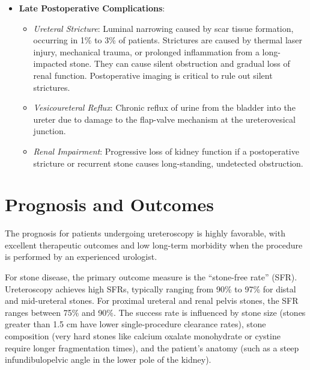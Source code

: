 \begin{itemize}
\begin{itemize}
  \item \textit{Urinary Retention}: Inability to void post-operatively due to bladder spasms, urethral irritation, or blood clots.
  \item \textit{Steinstrasse}: A column of small stone fragments that blocks the ureter post-lithotripsy, which may require secondary stenting or repeat ureteroscopy.
  \end{itemize}
\item \textbf{Late Postoperative Complications}:
  \begin{itemize}
  \item \textit{Ureteral Stricture}: Luminal narrowing caused by scar tissue formation, occurring in 1\% to 3\% of patients. Strictures are caused by thermal laser injury, mechanical trauma, or prolonged inflammation from a long-impacted stone. They can cause silent obstruction and gradual loss of renal function. Postoperative imaging is critical to rule out silent strictures.
  \item \textit{Vesicoureteral Reflux}: Chronic reflux of urine from the bladder into the ureter due to damage to the flap-valve mechanism at the ureterovesical junction.
  \item \textit{Renal Impairment}: Progressive loss of kidney function if a postoperative stricture or recurrent stone causes long-standing, undetected obstruction.
  \end{itemize}
\end{itemize}

\section*{Prognosis and Outcomes}
The prognosis for patients undergoing ureteroscopy is highly favorable, with excellent therapeutic outcomes and low long-term morbidity when the procedure is performed by an experienced urologist.

For stone disease, the primary outcome measure is the ``stone-free rate'' (SFR). Ureteroscopy achieves high SFRs, typically ranging from 90\% to 97\% for distal and mid-ureteral stones. For proximal ureteral and renal pelvis stones, the SFR ranges between 75\% and 90\%. The success rate is influenced by stone size (stones greater than 1.5 cm have lower single-procedure clearance rates), stone composition (very hard stones like calcium oxalate monohydrate or cystine require longer fragmentation times), and the patient's anatomy (such as a steep infundibulopelvic angle in the lower pole of the kidney).

